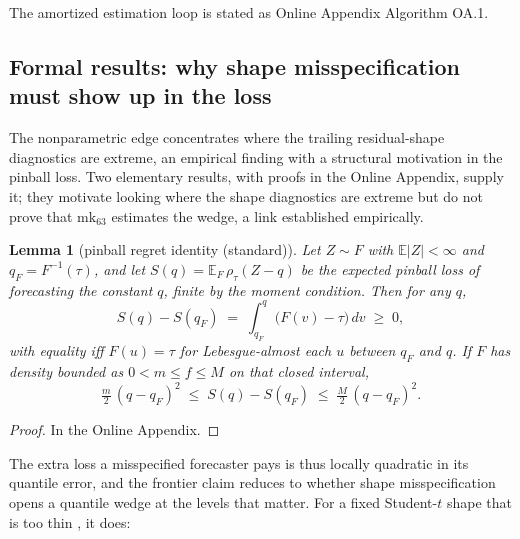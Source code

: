 \documentclass[11pt]{article}
\newtheorem{lemma}{Lemma}
\theoremstyle{remark}
\begin{document}
\noindent The amortized estimation loop is stated as Online Appendix Algorithm OA.1.

\subsection{Formal results: why shape misspecification must show up in
the loss}\label{sec:theory}

The nonparametric edge concentrates where the trailing residual-shape diagnostics are extreme, an empirical finding with a structural motivation in the pinball loss. Two elementary results, with proofs in the Online Appendix, supply it; they motivate looking where the shape diagnostics are extreme but do not prove that $\mathrm{mk}_{63}$ estimates the wedge, a link established empirically.

\begin{lemma}[pinball regret identity (standard)]\label{lem:regret}
Let $Z \sim F$ with $\mathbb{E}|Z| < \infty$ and $q_F = F^{-1}(\tau)$, and let $S(q) = \mathbb{E}_F\,\rho_\tau(Z - q)$ be the expected pinball loss of forecasting the constant $q$, finite by the moment condition. Then for any $q$,
\begin{equation}
S(q) - S(q_F) \;=\; \int_{q_F}^{q} \big(F(v) - \tau\big)\,dv \;\ge\; 0,
\label{eq:regret}
\end{equation}
with equality iff $F(u) = \tau$ for Lebesgue-almost each $u$ between $q_F$ and $q$.
If $F$ has density bounded as $0 < m \le f \le M$ on that closed interval,
\begin{equation}
\tfrac{m}{2}\,(q - q_F)^2 \;\le\; S(q) - S(q_F) \;\le\;
\tfrac{M}{2}\,(q - q_F)^2 .
\label{eq:quadratic}
\end{equation}
\end{lemma}
\begin{proof} In the Online Appendix. \end{proof}

The extra loss a misspecified forecaster pays is thus locally quadratic in its quantile error, and the frontier claim reduces to whether shape misspecification opens a quantile wedge at the levels that matter. For a fixed Student-$t$ shape that is too thin \citep{mcneilfrey2000, kuester2006}, it does:
\end{document}
